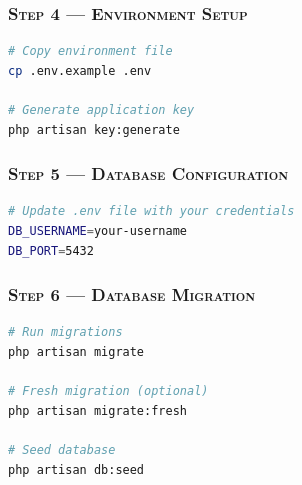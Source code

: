 \documentclass[12pt,letterpaper]{article}
\begin{document}
\subsubsection*{\textsc{Step 4 — Environment Setup}}
\begin{lstlisting}[language=bash]
# Copy environment file
cp .env.example .env

# Generate application key
php artisan key:generate
\end{lstlisting}

\subsubsection*{\textsc{Step 5 — Database Configuration}}
\begin{lstlisting}[language=bash]
# Update .env file with your credentials
DB_USERNAME=your-username
DB_PORT=5432
\end{lstlisting}

\subsubsection*{\textsc{Step 6 — Database Migration}}
\begin{lstlisting}[language=bash]
# Run migrations
php artisan migrate

# Fresh migration (optional)
php artisan migrate:fresh

# Seed database
php artisan db:seed
\end{lstlisting}

\end{document}
